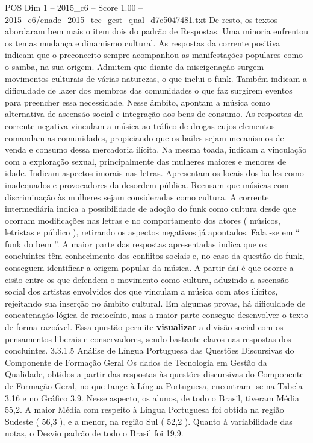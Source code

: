 \begin{textsample}{POS Dim 1 – 2015\_c6 – Score 1.00 – 2015\_c6/enade\_2015\_tec\_gest\_qual\_d7c5047481.txt}
De resto, os textos abordaram bem mais o item dois do padrão de Respostas.
Uma minoria enfrentou os temas mudança e dinamismo cultural.
As respostas da corrente positiva indicam que o preconceito sempre acompanhou as manifestações populares como o samba, na sua origem.
Admitem que diante da miscigenação surgem movimentos culturais de várias naturezas, o que inclui o funk.
Também indicam a dificuldade de lazer dos membros das comunidades o que faz surgirem eventos para preencher essa necessidade.
Nesse âmbito, apontam a música como alternativa de ascensão social e integração aos bens de consumo.
As respostas da corrente negativa vinculam a música ao tráfico de drogas cujos elementos comandam as comunidades, propiciando que os bailes sejam mecanismos de venda e consumo dessa mercadoria ilícita.
Na mesma toada, indicam a vinculação com a exploração sexual, principalmente das mulheres maiores e menores de idade.
Indicam aspectos imorais nas letras.
Apresentam os locais dos bailes como inadequados e provocadores da desordem pública.
Recusam que músicas com discriminação às mulheres sejam consideradas como cultura.
A corrente intermediária indica a possibilidade de adoção do funk como cultura desde que ocorram modificações nas letras e no comportamento dos atores ( músicos, letristas e público ), retirando os aspectos negativos já apontados.
Fala -se em “ funk do bem ”.
A maior parte das respostas apresentadas indica que os concluintes têm conhecimento dos conflitos sociais e, no caso da questão do funk, conseguem identificar a origem popular da música.
A partir daí é que ocorre a cisão entre os que defendem o movimento como cultura, aduzindo a ascensão social dos artistas envolvidos dos que vinculam a música com atos ilícitos, rejeitando sua inserção no âmbito cultural.
Em algumas provas, há dificuldade de concatenação lógica de raciocínio, mas a maior parte consegue desenvolver o texto de forma razoável.
Essa questão permite \textbf{visualizar} a divisão social com os pensamentos liberais e conservadores, sendo bastante claros nas respostas dos concluintes. 3.3.1.5 Análise de Língua Portuguesa das Questões Discursivas do Componente de Formação Geral Os dados de Tecnologia em Gestão da Qualidade, obtidos a partir das respostas às questões discursivas do Componente de Formação Geral, no que tange à Língua Portuguesa, encontram -se na Tabela 3.16 e no Gráfico 3.9.
Nesse aspecto, os alunos, de todo o Brasil, tiveram Média 55,2.
A maior Média com respeito à Língua Portuguesa foi obtida na região Sudeste ( 56,3 ), e a menor, na região Sul ( 52,2 ).
Quanto à variabilidade das notas, o Desvio padrão de todo o Brasil foi 19,9.

\end{textsample}
